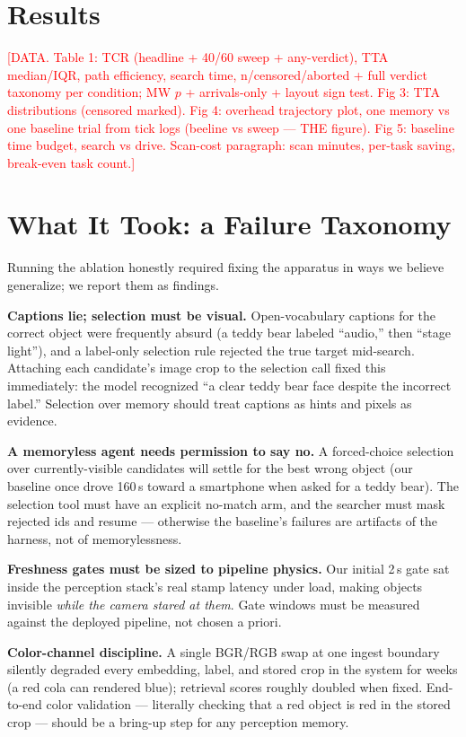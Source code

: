 \documentclass{article}
\newcommand{\todo}[1]{\textcolor{red}{[#1]}}
\begin{document}
\section{Results}
\label{sec:results}

\todo{DATA. Table 1: TCR (headline + 40/60 sweep + any-verdict), TTA
median/IQR, path efficiency, search time, n/censored/aborted + full
verdict taxonomy per condition; MW $p$ + arrivals-only + layout sign
test. Fig 3: TTA distributions (censored marked). Fig 4: overhead
trajectory plot, one memory vs one baseline trial from tick logs
(beeline vs sweep --- THE figure). Fig 5: baseline time budget,
search vs drive. Scan-cost paragraph: scan minutes, per-task saving,
break-even task count.}

\section{What It Took: a Failure Taxonomy}
\label{sec:lessons}

Running the ablation honestly required fixing the apparatus in ways we
believe generalize; we report them as findings.

\textbf{Captions lie; selection must be visual.} Open-vocabulary
captions for the correct object were frequently absurd (a teddy bear
labeled ``audio,'' then ``stage light''), and a label-only selection
rule rejected the true target mid-search. Attaching each candidate's
image crop to the selection call fixed this immediately: the model
recognized ``a clear teddy bear face despite the incorrect label.''
Selection over memory should treat captions as hints and pixels as
evidence.

\textbf{A memoryless agent needs permission to say no.} A forced-choice
selection over currently-visible candidates will settle for the best
wrong object (our baseline once drove 160\,s toward a smartphone when
asked for a teddy bear). The selection tool must have an explicit
no-match arm, and the searcher must mask rejected ids and resume ---
otherwise the baseline's failures are artifacts of the harness, not of
memorylessness.

\textbf{Freshness gates must be sized to pipeline physics.} Our
initial 2\,s gate sat inside the perception stack's real stamp latency
under load, making objects invisible \emph{while the camera stared at
them}. Gate windows must be measured against the deployed pipeline, not
chosen a priori.

\textbf{Color-channel discipline.} A single BGR/RGB swap at one
ingest boundary silently degraded every embedding, label, and stored
crop in the system for weeks (a red cola can rendered blue); retrieval
scores roughly doubled when fixed. End-to-end color validation ---
literally checking that a red object is red in the stored crop ---
should be a bring-up step for any perception memory.
\end{document}
